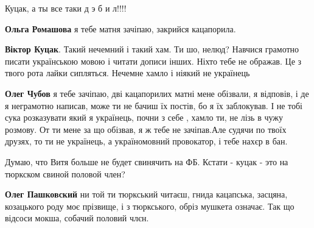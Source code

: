 \begin{itemize}

Куцак, а ты все таки д э б и л!!!!


\textbf{Ольга Ромашова} я тебе матня зачіпаю, закрийся кацапорила.


\textbf{Віктор Куцак}. Такий нечемний і такий хам. Ти шо, нелюд? Навчися
грамотно писати українською мовою і читати дописи інших. Ніхто тебе не ображав.
Це з твого рота лайки сипляться. Нечемне хамло і ніякий не українець


\textbf{Олег Чубов} я тебе зачіпаю, дві кацапорилих матні мене обізвали, я
відповів, і де я неграмотно написав, може ти не бачиш їх постів, бо я їх
заблокував. І не тобі сука розказувати який я українець, почни з себе , хамло
ти, не лізь в чужу розмову. От ти мене за що обізвав, я ж тебе не зачіпав.Але
судячи по твоїх друзях, то ти не українець, а україномовний провокатор, і тебе
нахєр в бан.


Думаю, что Витя больше не будет свинячить на ФБ. Кстати - куцак - это на тюркском свиной половой член?


\textbf{Олег Пашковский} ни той ти тюркський читаєш, гнида кацапська, засцяна,
козацького роду моє прізвище, і з тюркського, обріз мушкета означає. Так що
відсоси мокша, собачий половий члєн.

\end{itemize}

